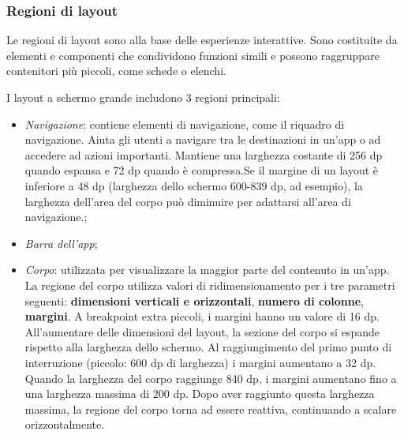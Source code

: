 \documentclass[12pt, a4paper]{report}
\begin{document}
		\subsubsection{Regioni di layout}
		Le regioni di layout sono alla base delle esperienze interattive. Sono costituite da elementi e componenti che condividono funzioni simili e possono raggruppare contenitori più piccoli, come schede o elenchi.

		I layout a schermo grande includono 3 regioni principali:
		\begin{itemize}
			\item \textit{Navigazione}: contiene elementi di navigazione, come il riquadro di navigazione. Aiuta gli utenti a navigare tra le destinazioni in un'app o ad accedere ad azioni importanti.
			Mantiene una larghezza costante di 256 dp quando espansa e 72 dp quando è compressa.Se il margine di un layout è inferiore a 48 dp (larghezza dello schermo 600-839 dp, ad esempio), la larghezza dell'area del corpo può diminuire per adattarsi all'area di navigazione.;
			\item \textit{Barra dell'app};
			\item \textit{Corpo}: utilizzata per visualizzare la maggior parte del contenuto in un'app. La regione del corpo utilizza valori di ridimensionamento per i tre parametri seguenti: \textbf{dimensioni verticali e orizzontali},
			\textbf{numero di colonne}, \textbf{margini}. A breakpoint extra piccoli, i margini hanno un valore di 16 dp. All'aumentare delle dimensioni del layout, la sezione del corpo si espande rispetto alla larghezza dello schermo. Al raggiungimento del primo punto di interruzione (piccolo: 600 dp di larghezza) i margini aumentano a 32 dp.
			Quando la larghezza del corpo raggiunge 840 dp, i margini aumentano fino a una larghezza massima di 200 dp. Dopo aver raggiunto questa larghezza massima, la regione del corpo torna ad essere reattiva, continuando a scalare orizzontalmente.
		\end{itemize}
\end{document}

